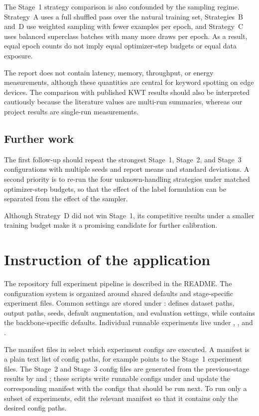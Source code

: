 \documentclass[11pt]{article}
\begin{document}
The Stage~1 strategy comparison is also confounded by the sampling regime. Strategy~A uses a full shuffled pass over the natural training set, Strategies~B and~D use weighted sampling with fewer examples per epoch, and Strategy~C uses balanced superclass batches with many more draws per epoch. As a result, equal epoch counts do not imply equal optimizer-step budgets or equal data exposure.

The report does not contain latency, memory, throughput, or energy measurements, although these quantities are central for keyword spotting on edge devices. The comparison with published KWT results should also be interpreted cautiously because the literature values are multi-run summaries, whereas our project results are single-run measurements.

\subsection*{Further work}

The first follow-up should repeat the strongest Stage~1, Stage~2, and Stage~3 configurations with multiple seeds and report means and standard deviations. A second priority is to re-run the four unknown-handling strategies under matched optimizer-step budgets, so that the effect of the label formulation can be separated from the effect of the sampler.

Although Strategy~D did not win Stage~1, its competitive results under a smaller training budget make it a promising candidate for further calibration.

\section{Instruction of the application}
\label{sec:instructions}
The repository full experiment pipeline is described in the README. The configuration system is organized around shared defaults and stage-specific experiment files. Common settings are stored under :  defines dataset paths, output paths, seeds, default augmentation, and evaluation settings, while  contains the backbone-specific defaults. Individual runnable experiments live under , , and . 

The manifest files in  select which experiment configs are executed. A manifest is a plain text list of config paths, for example  points to the Stage~1 experiment files. The Stage~2 and Stage~3 config files are generated from the previous-stage results by  and ; these scripts write runnable configs under  and update the corresponding manifest with the configs that should be run next. To run only a subset of experiments, edit the relevant manifest so that it contains only the desired config paths.
\end{document}
